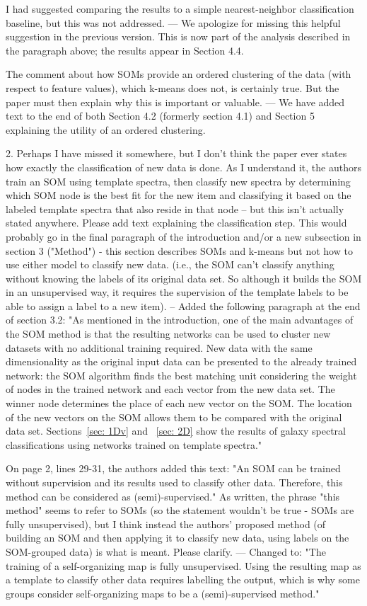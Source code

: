 I had suggested comparing the results to a simple nearest-neighbor classification baseline, but this was not addressed.
--- We apologize for missing this helpful suggestion in the previous version. This is now part of the analysis described in the paragraph above; the results appear in Section 4.4.

The comment about how SOMs provide an ordered clustering of the data (with respect to feature values), which k-means does not, is certainly true.  But the paper must then explain why this is important or valuable.
--- We have added text to the end of both Section 4.2 (formerly section 4.1) and Section 5 explaining the utility of an ordered clustering.

2. Perhaps I have missed it somewhere, but I don't think the paper ever states how exactly the classification of new data is done.  As I understand it, the authors train an SOM using template spectra, then classify new spectra by determining which SOM node is the best fit for the new item and classifying it based on the labeled template spectra that also reside in that node -- but this isn't actually stated anywhere.  Please add text explaining the classification step.  This would probably go in the final paragraph of the introduction and/or a new subsection in section 3 ("Method") - this section describes SOMs and k-means but not how to use either model to classify new data. (i.e., the SOM can't classify anything without knowing the labels of its original data set.  So although it builds the SOM in an unsupervised way, it requires the supervision of the template labels to be able to assign a label to a new item).
-- Added the following paragraph  at the end of section 3.2: 
    "As mentioned in the introduction, one of the main advantages of the SOM method  is that the resulting networks can be used to cluster new datasets with no additional training required. 
     New data with the same dimensionality as the original input data can be presented to the already trained network: the SOM algorithm finds the best matching unit considering the weight of nodes in the trained network and each vector from the new data set.
     The winner node determines the place of each new vector on the SOM.
     The location of the new vectors on the SOM allows them to be compared with the original data set. 
     Sections~\ref{sec: 1Dv} and ~\ref{sec: 2D} show the results of galaxy spectral classifications using networks trained on template spectra."

On page 2, lines 29-31, the authors added this text: "An SOM can be trained without supervision and its results used to classify other data. Therefore, this method can be considered as (semi)-supervised." As written, the phrase "this method" seems to refer to SOMs (so the statement wouldn't be true - SOMs are fully unsupervised), but I think instead the authors' proposed method (of building an SOM and then applying it to classify new data, using labels on the SOM-grouped data) is what is meant.  Please clarify.
--- Changed to: 
    "The training of a self-organizing map is fully unsupervised.
     Using the resulting map as a template to classify other data requires labelling the output, which is why some groups consider self-organizing maps to be a (semi)-supervised method."

